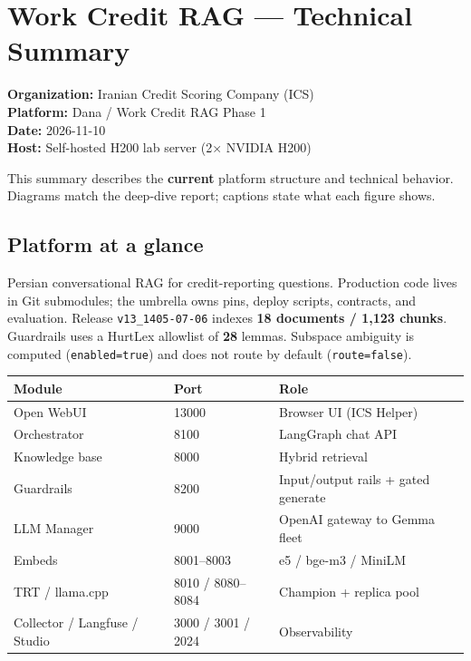 \chapter{Work Credit RAG --- Technical Summary}\label{work-credit-rag-technical-summary}

\textbf{Organization:} Iranian Credit Scoring Company (ICS)\\
\textbf{Platform:} Dana / Work Credit RAG Phase 1\\
\textbf{Date:} 2026-11-10\\
\textbf{Host:} Self-hosted H200 lab server (2× NVIDIA H200)

This summary describes the \textbf{current} platform structure and technical behavior. Diagrams match the deep-dive report; captions state what each figure shows.

\section{Platform at a glance}\label{platform-at-a-glance}

Persian conversational RAG for credit-reporting questions. Production code lives in Git submodules; the umbrella owns pins, deploy scripts, contracts, and evaluation. Release \texttt{v13\_1405-07-06} indexes \textbf{18 documents / 1,123 chunks}. Guardrails uses a HurtLex allowlist of \textbf{28} lemmas. Subspace ambiguity is computed (\texttt{enabled=true}) and does not route by default (\texttt{route=false}).

\begin{longtable}[]{@{}lll@{}}
\toprule\noalign{}
Module & Port & Role \\
\midrule\noalign{}
\endhead
\bottomrule\noalign{}
\endlastfoot
Open WebUI & 13000 & Browser UI (ICS Helper) \\
Orchestrator & 8100 & LangGraph chat API \\
Knowledge base & 8000 & Hybrid retrieval \\
Guardrails & 8200 & Input/output rails + gated generate \\
LLM Manager & 9000 & OpenAI gateway to Gemma fleet \\
Embeds & 8001--8003 & e5 / bge-m3 / MiniLM \\
TRT / llama.cpp & 8010 / 8080--8084 & Champion + replica pool \\
Collector / Langfuse / Studio & 3000 / 3001 / 2024 & Observability \\
\end{longtable}

